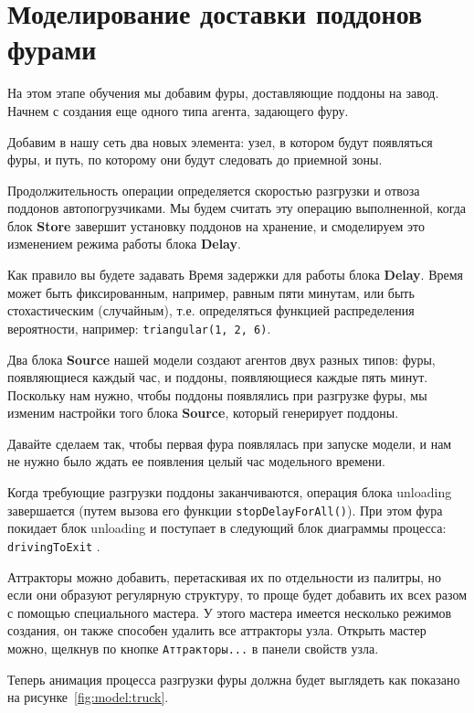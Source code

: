 \section{Моделирование доставки поддонов фурами}
На этом этапе обучения мы добавим фуры, доставляющие поддоны на завод.
Начнем с создания еще одного типа агента, задающего фуру.\par
Добавим в нашу сеть два новых элемента: узел, в котором будут появляться
фуры, и путь, по которому они будут следовать до приемной зоны.\par
Продолжительность операции определяется скоростью разгрузки и отвоза
поддонов автопогрузчиками. Мы будем считать эту операцию выполненной,
когда блок \textbf{Store} завершит установку поддонов на хранение,
и смоделируем это изменением режима работы блока \textbf{Delay}.\par
Как правило вы будете задавать Время задержки для работы блока \textbf{Delay}.
Время может быть фиксированным, например, равным пяти минутам, или быть
стохастическим (случайным), т.е. определяться функцией распределения
вероятности, например: \texttt{triangular(1, 2, 6)}.\par
Два блока \textbf{Source} нашей модели создают агентов двух разных типов:
фуры, появляющиеся каждый час, и поддоны, появляющиеся каждые пять минут.
Поскольку нам нужно, чтобы поддоны появлялись при разгрузке фуры, мы
изменим настройки того блока \textbf{Source}, который генерирует поддоны.\par
Давайте сделаем так, чтобы первая фура появлялась при запуске модели, и нам
не нужно было ждать ее появления целый час модельного времени.\par
Когда требующие разгрузки поддоны заканчиваются, операция блока unloading
завершается (путем вызова его функции \texttt{stopDelayForAll()}).
При этом фура покидает блок unloading и поступает в следующий блок
диаграммы процесса: \texttt{drivingToExit} .\par
Аттракторы можно добавить, перетаскивая их по отдельности из палитры, но
если они образуют регулярную структуру, то проще будет добавить их всех
разом с помощью специального мастера. У этого мастера имеется несколько
режимов создания, он также способен удалить все аттракторы узла. Открыть
мастер можно, щелкнув по кнопке \texttt{Aттракторы...}
в панели свойств узла.\par
Теперь анимация процесса разгрузки фуры должна будет выглядеть
как показано на рисунке~\ref{fig:model:truck}.

